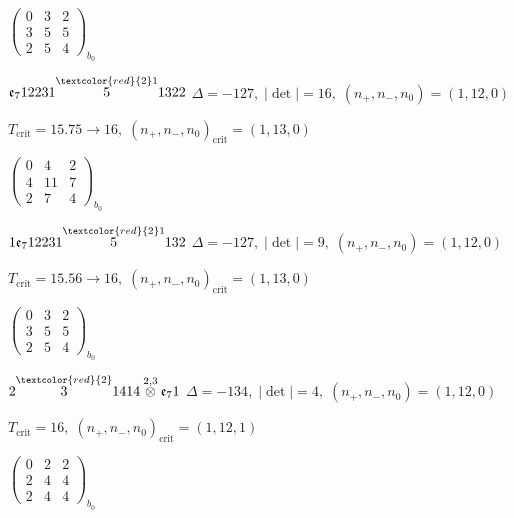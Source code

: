 \documentclass[10pt]{article}
\begin{document}
\hspace{2em}$\left(\begin{smallmatrix}0 & 3 & 2 \\ 3 & 5 & 5 \\ 2 & 5 & 4\end{smallmatrix}\right)_{\!b_0}$

\smallskip

$\mathfrak{e}_712231\overset{\textcolor{red}{2}1}{5}1322$ \quad $\Delta=-127,\; |\det|=16,\; (n_+,n_-,n_0)=(1,12,0)$

\hspace{1em}$T_{\text{crit}}=15.75 \to 16,\; (n_+,n_-,n_0)_{\text{crit}}=(1,13,0)$

\hspace{2em}$\left(\begin{smallmatrix}0 & 4 & 2 \\ 4 & 11 & 7 \\ 2 & 7 & 4\end{smallmatrix}\right)_{\!b_0}$

\smallskip

$1\mathfrak{e}_712231\overset{\textcolor{red}{2}1}{5}132$ \quad $\Delta=-127,\; |\det|=9,\; (n_+,n_-,n_0)=(1,12,0)$

\hspace{1em}$T_{\text{crit}}=15.56 \to 16,\; (n_+,n_-,n_0)_{\text{crit}}=(1,13,0)$

\hspace{2em}$\left(\begin{smallmatrix}0 & 3 & 2 \\ 3 & 5 & 5 \\ 2 & 5 & 4\end{smallmatrix}\right)_{\!b_0}$

\smallskip

$2\overset{\textcolor{red}{2}}{3}1414\overset{2,3}{\otimes}\mathfrak{e}_71$ \quad $\Delta=-134,\; |\det|=4,\; (n_+,n_-,n_0)=(1,12,0)$

\hspace{1em}$T_{\text{crit}}=16,\; (n_+,n_-,n_0)_{\text{crit}}=(1,12,1)$

\hspace{2em}$\left(\begin{smallmatrix}0 & 2 & 2 \\ 2 & 4 & 4 \\ 2 & 4 & 4\end{smallmatrix}\right)_{\!b_0}$
\end{document}

